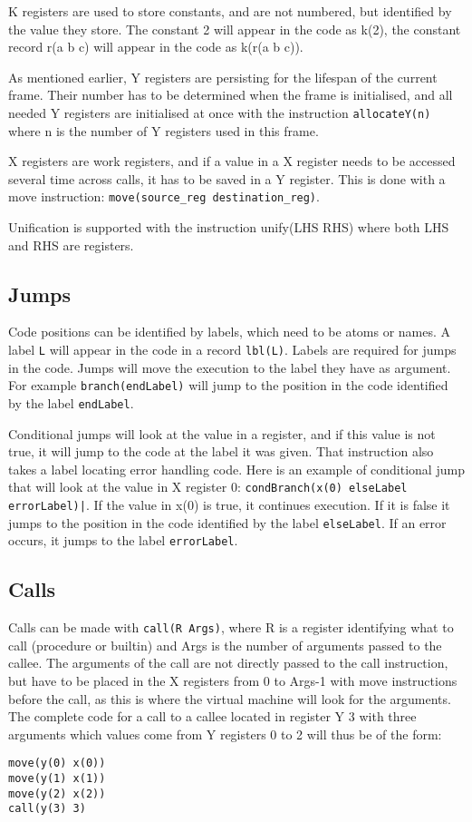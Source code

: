 \documentclass[a4paper]{memoir}
\begin{document}
K registers are used to store constants, and are not numbered, but identified by the value they store. The constant 2 will appear in the code as k(2), the constant record r(a b c) will appear in the code as k(r(a b c)).

As mentioned earlier, Y registers are persisting for the lifespan of the current frame. Their number has to be determined when the frame is initialised, and all needed Y registers are initialised at once with the instruction \lstinline!allocateY(n)! where n is the number of Y registers used in this frame.

X registers are work registers, and if a value in a X register needs to be accessed several time across calls, it has to be saved in a Y register. This is done with a move instruction: \lstinline!move(source_reg destination_reg)!.

Unification is supported with the instruction unify(LHS RHS) where both LHS and RHS are registers.

\subsection{Jumps}\label{sec:opcode:jumps}
Code positions can be identified by labels, which need to be atoms or names. A label \lstinline!L! will appear in the code in a record \lstinline!lbl(L)!. 
Labels are required for jumps in the code. 
Jumps will move the execution to the label they have as argument. For example \lstinline!branch(endLabel)! will jump to the position in the code identified by the label \lstinline!endLabel!.

Conditional jumps will look at the value in a register, and if this value is not true, it will jump to the code at the label it was given. That instruction also takes a label locating error handling code. Here is an example of conditional jump that will look at the value in X register 0: \lstinline!condBranch(x(0) elseLabel errorLabel)|!. If the value in x(0) is true, it continues execution. If it is false it jumps to the position in the code identified by the label \lstinline!elseLabel!. If an error occurs, it jumps to the label \lstinline!errorLabel!.


\subsection{Calls}\label{sec:opcode:calls}
Calls can be made with \lstinline!call(R Args)!, where R is a register identifying what to call (procedure or builtin) and Args is the number of arguments passed to the callee. The arguments of the call are not directly passed to the call instruction, but have to be placed in the X registers from 0 to Args-1 with move instructions before the call, as this is where the virtual machine will look for the arguments. The complete code for a call to a callee located in register Y 3 with three arguments which values come from Y registers 0 to 2 will thus be of the form:
\begin{lstlisting}
move(y(0) x(0))
move(y(1) x(1))
move(y(2) x(2))
call(y(3) 3)
\end{lstlisting}
\end{document}
